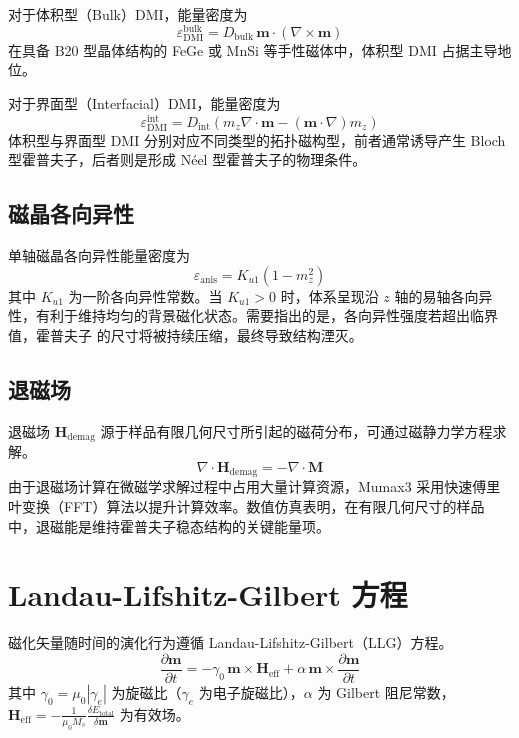 对于体积型（Bulk）DMI，能量密度为
\begin{equation}
  \varepsilon_{\text{DMI}}^{\text{bulk}} = D_{\text{bulk}} \, \mathbf{m} \cdot (\nabla \times \mathbf{m})
  \label{eq:dmi-bulk}
\end{equation}
在具备 B20 型晶体结构的 FeGe 或 MnSi 等手性磁体中，体积型 DMI 占据主导地位。

对于界面型（Interfacial）DMI，能量密度为
\begin{equation}
  \varepsilon_{\text{DMI}}^{\text{int}} = D_{\text{int}} \left( m_z \nabla \cdot \mathbf{m} - (\mathbf{m} \cdot \nabla) m_z \right)
  \label{eq:dmi-int}
\end{equation}
体积型与界面型 DMI 分别对应不同类型的拓扑磁构型，前者通常诱导产生 Bloch 型霍普夫子，后者则是形成 N\'{e}el 型霍普夫子的物理条件。

\subsection{磁晶各向异性}
单轴磁晶各向异性能量密度为
\begin{equation}
  \varepsilon_{\text{anis}} = K_{u1} (1 - m_z^2)
  \label{eq:anisotropy}
\end{equation}
其中 $K_{u1}$ 为一阶各向异性常数。当 $K_{u1} > 0$ 时，体系呈现沿 $z$ 轴的易轴各向异性，有利于维持均匀的背景磁化状态。需要指出的是，各向异性强度若超出临界值，霍普夫子 的尺寸将被持续压缩，最终导致结构湮灭。

\subsection{退磁场}
退磁场 $\mathbf{H}_{\text{demag}}$ 源于样品有限几何尺寸所引起的磁荷分布，可通过磁静力学方程求解。
\begin{equation}
  \nabla \cdot \mathbf{H}_{\text{demag}} = -\nabla \cdot \mathbf{M}
  \label{eq:demag}
\end{equation}
由于退磁场计算在微磁学求解过程中占用大量计算资源，Mumax3 采用快速傅里叶变换（FFT）算法以提升计算效率。数值仿真表明，在有限几何尺寸的样品中，退磁能是维持霍普夫子稳态结构的关键能量项。


\section{Landau-Lifshitz-Gilbert 方程}

磁化矢量随时间的演化行为遵循 Landau-Lifshitz-Gilbert（LLG）方程。
\begin{equation}
  \frac{\partial \mathbf{m}}{\partial t} = -\gamma_0 \, \mathbf{m} \times \mathbf{H}_{\text{eff}} + \alpha \, \mathbf{m} \times \frac{\partial \mathbf{m}}{\partial t}
  \label{eq:llg}
\end{equation}
其中 $\gamma_0 = \mu_0 |\gamma_e|$ 为旋磁比（$\gamma_e$ 为电子旋磁比），$\alpha$ 为 Gilbert 阻尼常数，$\mathbf{H}_{\text{eff}} = -\frac{1}{\mu_0 M_s}\frac{\delta E_{\text{total}}}{\delta \mathbf{m}}$ 为有效场。

